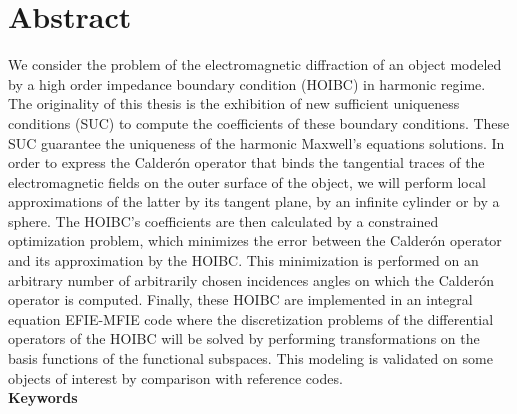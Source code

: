 \section*{Abstract}
We consider the problem of the electromagnetic diffraction of an object modeled by a high order impedance boundary condition (HOIBC) in harmonic regime.
The originality of this thesis is the exhibition of new sufficient uniqueness conditions (SUC) to compute the coefficients of these boundary conditions. These SUC guarantee the uniqueness of the  harmonic Maxwell's equations solutions.
In order to express the Calderón operator that binds the tangential traces of the electromagnetic fields on the outer surface of the object, we will perform local approximations of the latter by its tangent plane, by an infinite cylinder or by a sphere.
The HOIBC's coefficients are then calculated by a constrained optimization problem, which minimizes the error between the Calderón operator and its approximation by the HOIBC.
This minimization is performed on an arbitrary number of arbitrarily chosen incidences angles on which the Calderón operator is computed.
Finally, these HOIBC are implemented in an integral equation EFIE-MFIE code where the discretization problems of the differential operators of the HOIBC will be solved by performing transformations on the basis functions of the functional subspaces.
This modeling is validated on some objects of interest by comparison with reference codes.
\\

\textbf{Keywords}


\dockeywordseng
